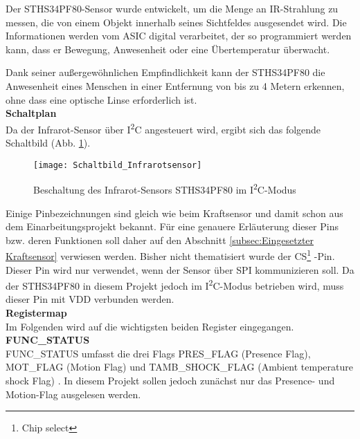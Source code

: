 \documentclass[
	letterpaper, %
	10pt, %
]{CSUniSchoolLabReport}
\begin{document}
\begin{spacing}{1.6}
Der STHS34PF80-Sensor wurde entwickelt, um die Menge an IR-Strahlung zu messen, die von einem Objekt innerhalb seines Sichtfeldes ausgesendet wird. Die Informationen werden vom ASIC digital verarbeitet, der so programmiert werden kann, dass er Bewegung, Anwesenheit oder eine Übertemperatur überwacht.

Dank seiner außergewöhnlichen Empfindlichkeit kann der STHS34PF80 die Anwesenheit eines Menschen in einer Entfernung von bis zu 4 Metern erkennen, ohne dass eine optische Linse erforderlich ist. \cite{STHS34PF80}\\

\textbf{Schaltplan}\\
Da der Infrarot-Sensor über I\textsuperscript{2}C angesteuert wird, ergibt sich das folgende Schaltbild (Abb. \ref{fig:Schaltbild_Infrarotsensor}).
\begin{figure}[H]
    \centering
    \texttt{[image: Schaltbild\_Infrarotsensor]}
    \caption{Beschaltung des Infrarot-Sensors STHS34PF80 im I\textsuperscript{2}C-Modus \cite[17]{STHS34PF80}}
    \label{fig:Schaltbild_Infrarotsensor}
\end{figure}

Einige Pinbezeichnungen sind gleich wie beim Kraftsensor und damit schon aus dem Einarbeitungsprojekt bekannt. Für eine genauere Erläuterung dieser Pins bzw. deren Funktionen soll daher auf den Abschnitt \ref{subsec:Eingesetzter Kraftsensor} verwiesen werden. Bisher nicht thematisiert wurde der \glqq CS\footnote{Chip select} \grqq-Pin. Dieser Pin wird nur verwendet, wenn der Sensor über SPI kommunizieren soll. Da der STHS34PF80 in diesem Projekt jedoch im I\textsuperscript{2}C-Modus betrieben wird, muss dieser Pin mit VDD verbunden werden.\\

\newpage
\textbf{Registermap}\\
Im Folgenden wird auf die wichtigsten beiden Register eingegangen.\\
$ $\\
\textbf{FUNC\_STATUS}\\
FUNC\_STATUS umfasst die drei Flags PRES\_FLAG (Presence Flag), MOT\_FLAG (Motion Flag) und TAMB\_SHOCK\_FLAG (Ambient temperature shock Flag) \cite[27]{STHS34PF80}. In diesem Projekt sollen jedoch zunächst nur das Presence- und Motion-Flag ausgelesen werden.\\


\end{spacing}
\end{document}
